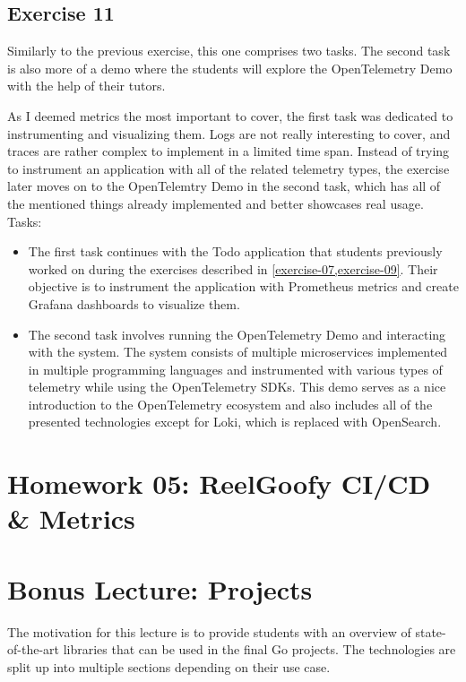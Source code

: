 \documentclass[
  digital,
  color,
  oneside,
  nosansbold,
  nocolorbold,
  nolof,
  nolot,
]{fithesis4}
\begin{document}
\subsection{Exercise 11}\label{exercise-11}

Similarly to the previous exercise, this one comprises two tasks. The second task is also more of a demo where the students will explore the OpenTelemetry Demo\cite{open-telemetry-demo} with the help of their tutors.

As I deemed metrics the most important to cover, the first task was dedicated to instrumenting and visualizing them. Logs are not really interesting to cover, and traces are rather complex to implement in a limited time span. Instead of trying to instrument an application with all of the related telemetry types, the exercise later moves on to the OpenTelemtry Demo in the second task, which has all of the mentioned things already implemented and better showcases real usage. \\

\noindent
Tasks:
\begin{itemize}
    \item The first task continues with the Todo application that students previously worked on during the exercises described in \cref{exercise-07,exercise-09}. Their objective is to instrument the application with Prometheus metrics and create Grafana dashboards to visualize them.
    \item The second task involves running the OpenTelemetry Demo and interacting with the system. The system consists of multiple microservices implemented in multiple programming languages and instrumented with various types of telemetry while using the OpenTelemetry SDKs. This demo serves as a nice introduction to the OpenTelemetry ecosystem and also includes all of the presented technologies except for Loki, which is replaced with OpenSearch\cite{opensearch}.
\end{itemize}

\section{Homework 05: ReelGoofy CI/CD \& Metrics}

\section{Bonus Lecture: Projects} \label{lecture-projects}

The motivation for this lecture is to provide students with an overview of state-of-the-art libraries that can be used in the final Go projects. The technologies are split up into multiple sections depending on their use case.
\end{document}

